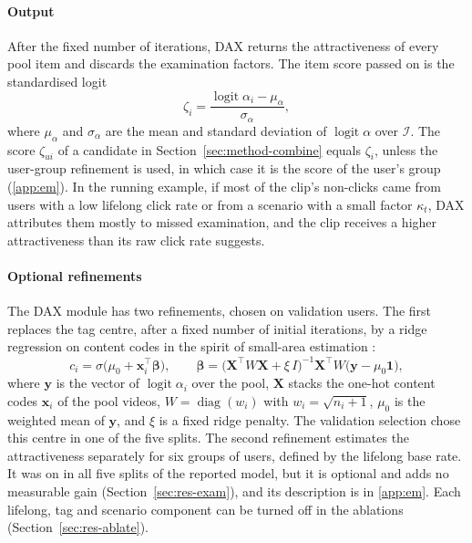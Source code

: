 \documentclass[preprint,12pt,authoryear]{elsarticle}
\begin{document}
\paragraph{Output} After the fixed number of iterations, DAX returns the attractiveness of every pool item and discards the examination
factors. The item score passed on is the standardised logit
\begin{equation}
  \zeta_i=\frac{\operatorname{logit}\alpha_i-\mu_\alpha}{\sigma_\alpha},
  \label{eq:zeta}
\end{equation}
where $\mu_\alpha$ and $\sigma_\alpha$ are the mean and standard deviation of $\operatorname{logit}\alpha$ over $\mathcal I$. The score
$\zeta_{ui}$ of a candidate in Section~\ref{sec:method-combine} equals $\zeta_i$, unless the user-group refinement is used, in which case
it is the score of the user's group (\ref{app:em}). In the running
example, if most of the clip's non-clicks came from users with a low lifelong click rate or from a scenario with a small factor $\kappa_t$, DAX
attributes them mostly to missed examination, and the clip receives a higher attractiveness than its raw click rate suggests.

\paragraph{Optional refinements} The DAX module has two refinements, chosen on validation users. The first replaces the tag centre, after a fixed number of initial iterations, by a ridge regression on content codes in the spirit of small-area estimation \citep{fay1979smallarea}:
\begin{equation}
  c_i=\sigma\bigl(\mu_0+\mathbf x_i^{\top}\boldsymbol\beta\bigr),\qquad
  \boldsymbol\beta=\bigl(\mathbf X^{\top}W\mathbf X+\xi\,I\bigr)^{-1}\mathbf X^{\top}W\bigl(\mathbf y-\mu_0\mathbf 1\bigr),
  \label{eq:content-centre}
\end{equation}
where $\mathbf y$ is the vector of $\operatorname{logit}\alpha_i$ over the pool, $\mathbf X$ stacks the one-hot content codes $\mathbf x_i$ of the
pool videos, $W=\operatorname{diag}(w_i)$ with $w_i=\sqrt{n_i+1}$, $\mu_0$ is the weighted mean of $\mathbf y$, and $\xi$ is a fixed ridge penalty. The validation selection chose this centre in one of the
five splits.
The second refinement estimates the attractiveness separately for six groups of users, defined by the lifelong base rate. It was on in
all five splits of the reported model, but it is optional and adds no measurable gain (Section~\ref{sec:res-exam}),
and its description is in \ref{app:em}. Each lifelong, tag and scenario component can be turned off in the ablations
(Section~\ref{sec:res-ablate}).
\end{document}
